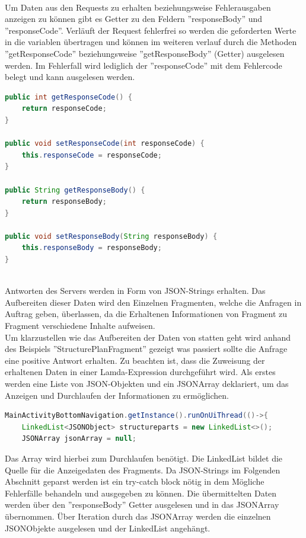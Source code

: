 \cite{OkHttp3}
\\
Um Daten aus den Requests zu erhalten beziehungsweise Fehlerausgaben anzeigen zu können gibt es Getter zu den Feldern ''responseBody'' und ''responseCode''. Verläuft der Request fehlerfrei so werden die geforderten Werte in die variablen übertragen und können im weiteren verlauf durch die Methoden ''getResponseCode'' beziehungsweise ''getResponseBody'' (Getter) ausgelesen werden. Im Fehlerfall wird lediglich der ''responseCode'' mit dem Fehlercode belegt und kann ausgelesen werden. 
\begin{lstlisting}[language=Java,caption={Getter und Setter für erhaltene Daten}]
public int getResponseCode() {
    return responseCode;
}

public void setResponseCode(int responseCode) {
    this.responseCode = responseCode;
}

public String getResponseBody() {
    return responseBody;
}

public void setResponseBody(String responseBody) {
    this.responseBody = responseBody;
}
\end{lstlisting}
\\
Antworten des Servers werden in Form von JSON-Strings erhalten. Das Aufbereiten dieser Daten wird den Einzelnen Fragmenten, welche die Anfragen in Auftrag geben, überlassen, da die Erhaltenen Informationen von Fragment zu Fragment verschiedene Inhalte aufweisen. 
\\
Um klarzustellen wie das Aufbereiten der Daten von statten geht wird anhand des Beispiels ''StructurePlanFragment'' gezeigt was passiert sollte die Anfrage eine positive Antwort erhalten. Zu beachten ist, dass die Zuweisung der erhaltenen Daten in einer Lamda-Expression durchgeführt wird. Als erstes werden eine Liste von JSON-Objekten und ein JSONArray deklariert, um das Anzeigen und Durchlaufen der Informationen zu ermöglichen.
\begin{lstlisting}[language=Java,caption={Erstellen der benötigten Variablen}]
MainActivityBottomNavigation.getInstance().runOnUiThread(()->{
	LinkedList<JSONObject> structureparts = new LinkedList<>();
    JSONArray jsonArray = null;
\end{lstlisting}
Das Array wird hierbei zum Durchlaufen benötigt. Die LinkedList bildet die Quelle für die Anzeigedaten des Fragments. Da JSON-Strings im Folgenden Abschnitt geparst werden ist ein try-catch block nötig in dem Mögliche Fehlerfälle behandeln und ausgegeben zu können. Die übermittelten Daten werden über den ''responseBody'' Getter ausgelesen und in das JSONArray übernommen. Über Iteration durch das JSONArray werden die einzelnen JSONObjekte ausgelesen und der LinkedList angehängt.
